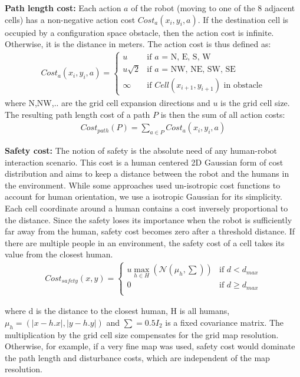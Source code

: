 \textbf{Path length cost:}  Each action $a$ of the robot (moving to one of the 8 adjacent cells) has a non-negative action cost $Cost_{a}(x_{i},y_{i},a)$. If the destination cell is occupied by a configuration space obstacle, then the action cost is infinite. Otherwise, it is the distance in meters. The action cost is thus defined as:
\begin{align}
Cost_{a}(x_{i},y_{i},a)=\left\{ \begin{array}{cl}
u & \textrm{if $a$ = N, E, S, W}\\
u\sqrt{2} & \textrm{if $a$ = NW, NE, SW, SE}\\
\infty & \textrm{if  $Cell(x_{i+1}, y_{i+1})$ in obstacle} \end{array}\right.
\end{align}
where N,NW,.. are the grid cell expansion directions and $u$ is the grid cell size. The resulting path length cost of a path $P$ is then the sum of all action costs: 
\begin{align}
Cost_{path}(P) = \sum\limits_{a \in P} Cost_{a}(x_{i},y_{i},a)
\end{align}

\textbf{Safety cost:} The notion of safety is the absolute need of any human-robot interaction scenario. This cost is a human centered 2D Gaussian form of cost distribution and aims to keep a distance between the robot and the humans in the environment. While some approaches used un-isotropic cost functions to account for human orientation, we use a isotropic Gaussian for its simplicity. Each cell coordinate around a human contains a cost inversely proportional to the distance. Since the safety loses its importance when the robot is sufficiently far away from the human, safety cost becomes zero after a threshold distance. If there are multiple people in an environment, the safety cost of a cell takes its value from the closest human.
\begin{align}
Cost_{safety}(x,y)=\left\{ \begin{array}{cl}
u\max_{h\in H}(\mathcal{N}(\mu_h,\sum)) & \textrm{if $d<d_{max}$}\\
0 & \textrm{if $d\geq d_{max}$}\\
\end{array}\right.
\end{align}

where d is the distance to the closest human, H is all humans, $\mu_h = (|x - h.x|,|y - h.y|)$ and $\sum = 0.5I_2$ is a fixed covariance matrix. The multiplication by the grid cell size compensates for the grid map resolution. Otherwise, for example, if a very fine map was used, safety cost would dominate the path length and disturbance costs, which are independent of the map resolution.
 
